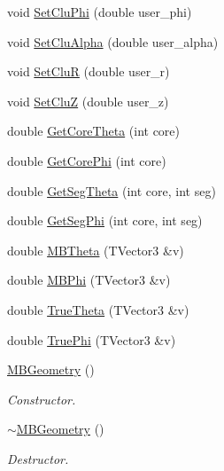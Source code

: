\begin{DoxyCompactItemize}
\item 
void \hyperlink{class_m_b_geometry_a74142f84cf6317d52ae39c0e0ff8a87e}{Set\+Clu\+Phi} (double user\+\_\+phi)
\item 
void \hyperlink{class_m_b_geometry_a0d4868b0360a6e5534918a9813540015}{Set\+Clu\+Alpha} (double user\+\_\+alpha)
\item 
void \hyperlink{class_m_b_geometry_a292c4326421c78871667e91c3694ae35}{Set\+CluR} (double user\+\_\+r)
\item 
void \hyperlink{class_m_b_geometry_aa6b9d54c7157e8c65e2b208fcef8222c}{Set\+CluZ} (double user\+\_\+z)
\item 
double \hyperlink{class_m_b_geometry_a42aa536f15017724812712b0f8a77c12}{Get\+Core\+Theta} (int core)
\item 
double \hyperlink{class_m_b_geometry_a39f685610ae0e68e547a46f8ef992599}{Get\+Core\+Phi} (int core)
\item 
double \hyperlink{class_m_b_geometry_a49cdf742a2902fc85f0b24dfffa554a8}{Get\+Seg\+Theta} (int core, int seg)
\item 
double \hyperlink{class_m_b_geometry_a575ddd6022d2d686a83ebce3195b6c50}{Get\+Seg\+Phi} (int core, int seg)
\item 
double \hyperlink{class_m_b_geometry_af4adfb858000405b21f79a6bf10c3c37}{M\+B\+Theta} (T\+Vector3 \&v)
\item 
double \hyperlink{class_m_b_geometry_a399568d67bb83801ef6a2dbe963a535e}{M\+B\+Phi} (T\+Vector3 \&v)
\item 
double \hyperlink{class_m_b_geometry_afd393f9db7182de7fb19f0c934edb383}{True\+Theta} (T\+Vector3 \&v)
\item 
double \hyperlink{class_m_b_geometry_a718d9c7fcc4a5fb8b9ecaabdc7a0503f}{True\+Phi} (T\+Vector3 \&v)
\item 
\mbox{\label{class_m_b_geometry_a47eba401cd9bb4452df2f812c6a7e446}} 
\hyperlink{class_m_b_geometry_a47eba401cd9bb4452df2f812c6a7e446}{M\+B\+Geometry} ()
\begin{DoxyCompactList}\small\item\em Constructor. \end{DoxyCompactList}\item 
\mbox{\label{class_m_b_geometry_a6359b9d13d3b062ac2153087fc1b172b}} 
\hyperlink{class_m_b_geometry_a6359b9d13d3b062ac2153087fc1b172b}{$\sim$\+M\+B\+Geometry} ()
\begin{DoxyCompactList}\small\item\em Destructor. \end{DoxyCompactList}\item 

\end{DoxyCompactItemize}
